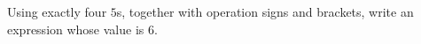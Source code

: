 Using exactly four $5$s, together with operation signs and brackets, write an expression whose value is $6$.
